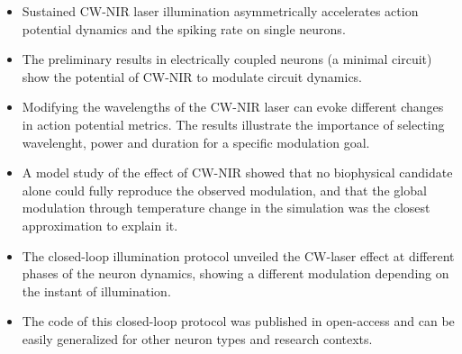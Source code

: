 \begin{itemize}
     \begin{itemize}
         \item Sustained CW-NIR laser illumination asymmetrically accelerates action potential dynamics and the spiking rate on single neurons.
         \item The preliminary results in electrically coupled neurons (a minimal circuit) show the potential of CW-NIR to modulate circuit dynamics.
         \item    Modifying the wavelengths of the CW-NIR laser can evoke different changes in action potential metrics. The results illustrate the importance of selecting  wavelenght, power and duration for a specific modulation goal.
         \item A model study of the effect of CW-NIR showed that no biophysical candidate alone could fully reproduce the observed modulation,  and that the global modulation through temperature change in the simulation was the closest approximation to explain it.
         \item The closed-loop illumination protocol unveiled the CW-laser effect at different phases of the neuron dynamics, showing a different modulation depending on the instant of illumination.
         \item The code of this closed-loop protocol was published in open-access and can be easily generalized for other neuron types and research contexts.
     \end{itemize}
\end{itemize}
